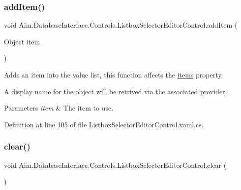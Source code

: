 \subsubsection{\texorpdfstring{add\+Item()}{addItem()}}
{\footnotesize\ttfamily void Aim.\+Database\+Interface.\+Controls.\+Listbox\+Selector\+Editor\+Control.\+add\+Item (\begin{DoxyParamCaption}\item[{Object}]{item }\end{DoxyParamCaption})\hspace{0.3cm}{\ttfamily [inline]}}



Adds an item into the value list, this function affects the \mbox{\hyperlink{class_aim_1_1_database_interface_1_1_controls_1_1_listbox_selector_editor_control_ad1de3dde9f4b18186482336335f7efc2}{items}} property. 

A display name for the object will be retrived via the associated \mbox{\hyperlink{class_aim_1_1_database_interface_1_1_controls_1_1_listbox_selector_editor_control_a8134970f3f55df8df50e1496d4dcc1bb}{provider}}. 


\begin{DoxyParams}{Parameters}
{\em item} & The item to use.\\
\hline
\end{DoxyParams}


Definition at line 105 of file Listbox\+Selector\+Editor\+Control.\+xaml.\+cs.

\mbox{\label{class_aim_1_1_database_interface_1_1_controls_1_1_listbox_selector_editor_control_ac468cf3c7fa247856fa48cca98b310e0}} 
\subsubsection{\texorpdfstring{clear()}{clear()}}
{\footnotesize\ttfamily void Aim.\+Database\+Interface.\+Controls.\+Listbox\+Selector\+Editor\+Control.\+clear (\begin{DoxyParamCaption}{ }\end{DoxyParamCaption})\hspace{0.3cm}{\ttfamily [inline]}}



